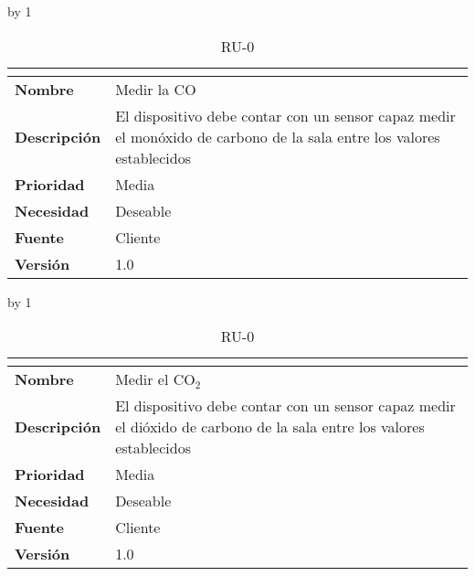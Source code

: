 \advance\ru by 1
\begin{table}[H]
	\caption{RU-0\number\ru}
	\begin{tabular}{|l|p{}|}
		\hline
		\multicolumn{2}{|c|}{\cellcolor[HTML]{BFBFBF}{\color[HTML]{000000} \textbf{RU-0\number\ru}}} \\ \hline
		\textbf{Nombre}      & Medir la CO                                                                                                           \\ \hline
		\textbf{Descripción} & El dispositivo debe contar con un sensor capaz medir el monóxido de carbono de la sala entre los valores establecidos \\ \hline
		\textbf{Prioridad}   & Media                                                                                                                 \\ \hline
		\textbf{Necesidad}   & Deseable                                                                                                              \\ \hline
		\textbf{Fuente}      & Cliente                                                                                                               \\ \hline
		\textbf{Versión}     & 1.0                                                                                                                   \\ \hline
	\end{tabular}
\end{table}
\advance\ru by 1
\begin{table}[H]
	\caption{RU-0\number\ru}
	\begin{tabular}{|l|p{}|}
		\hline
		\multicolumn{2}{|c|}{\cellcolor[HTML]{BFBFBF}{\color[HTML]{000000} \textbf{RU-0\number\ru}}} \\ \hline
		\textbf{Nombre}      & Medir el CO$_2$                                                                                                      \\ \hline
		\textbf{Descripción} & El dispositivo debe contar con un sensor capaz medir el dióxido de carbono de la sala entre los valores establecidos \\ \hline
		\textbf{Prioridad}   & Media                                                                                                                \\ \hline
		\textbf{Necesidad}   & Deseable                                                                                                             \\ \hline
		\textbf{Fuente}      & Cliente                                                                                                              \\ \hline
		\textbf{Versión}     & 1.0                                                                                                                  \\ \hline
	\end{tabular}
\end{table}
